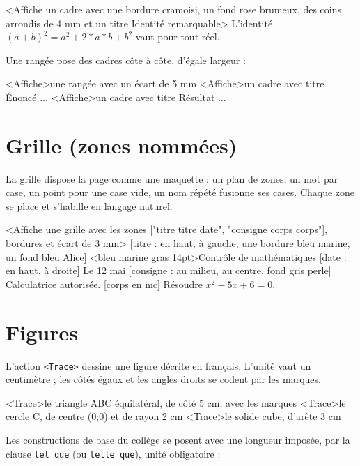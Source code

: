 \documentclass[11pt,a4paper]{article}
\newcommand{\bal}[1]{\texttt{#1}}
\begin{document}
\begin{code}
<Affiche un cadre avec une bordure cramoisi, un fond rose brumeux,
    des coins arrondis de 4 mm et un titre {Identité remarquable}>{
    L'identité $(a + b)^2 = a^2 + 2*a*b + b^2$ vaut pour tout réel.
}
\end{code}

Une rangée pose des cadres côte à côte, d'égale largeur :

\begin{code}
<Affiche>une rangée avec un écart de 5 mm{
    <Affiche>un cadre avec titre {Énoncé}{ ... }
    <Affiche>un cadre avec titre {Résultat}{ ... }
}
\end{code}

\section{Grille (zones nommées)}

La grille dispose la page comme une maquette : un plan de zones, un mot
par case, un point pour une case vide, un nom répété fusionne ses
cases. Chaque zone se place et s'habille en langage naturel.

\begin{code}
<Affiche une grille avec les zones ["titre titre date", "consigne corps corps"],
    bordures et écart de 3 mm>{
    [titre : en haut, à gauche, une bordure bleu marine, un fond bleu Alice]{
        <bleu marine gras 14pt>Contrôle de mathématiques
    }
    [date : en haut, à droite]{ Le 12 mai }
    [consigne : au milieu, au centre, fond gris perle]{
        Calculatrice autorisée.
    }
    [corps en mc]{ Résoudre $x^2 - 5x + 6 = 0$. }
}
\end{code}

\section{Figures}

L'action \bal{<Trace>} dessine une figure décrite en français.
L'unité vaut un centimètre ; les côtés égaux et les angles droits se
codent par les marques.

\begin{code}
<Trace>le triangle ABC équilatéral, de côté 5 cm, avec les marques
<Trace>le cercle C, de centre (0;0) et de rayon 2 cm
<Trace>le solide cube, d'arête 3 cm
\end{code}

Les constructions de base du collège se posent avec une longueur
imposée, par la clause \bal{tel que} (ou \bal{telle que}), unité
obligatoire :
\end{document}
